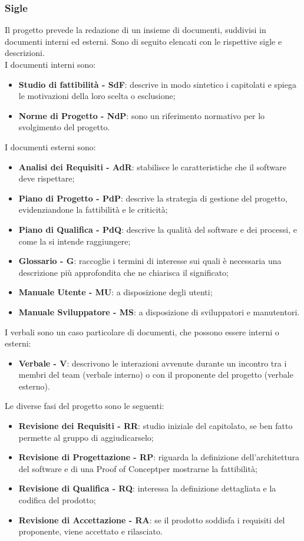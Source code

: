 \subsubsection{Sigle}
Il progetto prevede la redazione di un insieme di documenti, suddivisi in documenti interni ed esterni. Sono di seguito elencati con le rispettive sigle e descrizioni. \\
I documenti interni sono: \begin{itemize}
\item \textbf{Studio di fattibilità - SdF}: descrive in modo sintetico i capitolati e spiega le motivazioni della loro scelta o esclusione;
\item \textbf{Norme di Progetto - NdP}: sono un riferimento normativo per lo svolgimento del progetto.
\end{itemize}
I documenti esterni sono: \begin{itemize}
\item \textbf{Analisi dei Requisiti - AdR}: stabilisce le caratteristiche che il software deve rispettare; 
\item \textbf{Piano di Progetto - PdP}: descrive la strategia di gestione del progetto, evidenziandone la fattibilità e le criticità;
\item \textbf{Piano di Qualifica - PdQ}: descrive la qualità del software e dei processi, e come la si intende raggiungere;
\item \textbf{Glossario - G}: raccoglie i termini di interesse sui quali è necessaria una descrizione più approfondita che ne chiarisca il significato;
\item \textbf{Manuale Utente - MU}: a disposizione degli utenti;
\item \textbf{Manuale Sviluppatore - MS}: a disposizione di sviluppatori e manutentori.
\end{itemize}
I verbali sono un caso particolare di documenti, che possono essere interni o esterni:
\begin{itemize}
\item \textbf{Verbale - V}: descrivono le interazioni avvenute durante un incontro tra i membri del team (verbale interno) o con il proponente del progetto (verbale esterno).
\end{itemize} 
Le diverse fasi del progetto sono le seguenti:
\begin{itemize}
\item \textbf{Revisione dei Requisiti - RR}: studio iniziale del capitolato, se ben fatto permette al gruppo di aggiudicarselo;
\item \textbf{Revisione di Progettazione - RP}: riguarda la definizione dell'architettura del software e di una Proof of Concept\glo per mostrarne la fattibilità;
\item \textbf{Revisione di Qualifica - RQ}: interessa la definizione dettagliata e la codifica del prodotto;
\item \textbf{Revisione di Accettazione - RA}: se il prodotto soddisfa i requisiti del proponente, viene accettato e rilasciato.
\end{itemize}

